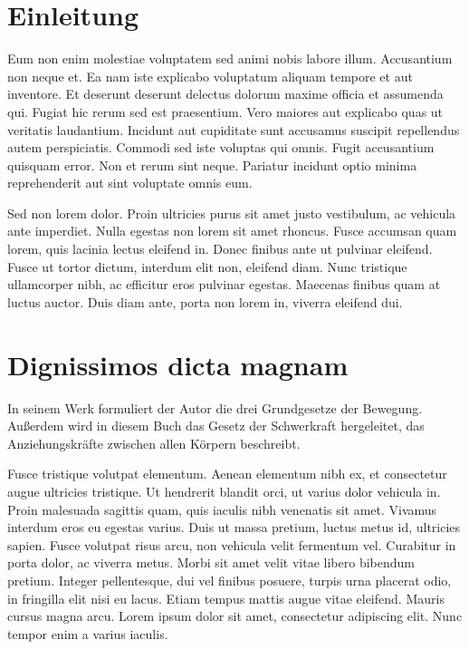 \documentclass[12pt, a4paper]{article}
\begin{document}
\pagestyle{empty}


\tableofcontents
\newpage
\pagestyle{plain}

\section{Einleitung}

Eum non enim molestiae voluptatem sed animi nobis labore illum. Accusantium non neque et. Ea nam iste explicabo voluptatum aliquam tempore et aut inventore. Et deserunt deserunt delectus dolorum maxime officia et assumenda qui. Fugiat hic rerum sed est praesentium. Vero maiores aut explicabo quas ut veritatis laudantium. Incidunt aut cupiditate sunt accusamus suscipit repellendus autem perspiciatis. Commodi sed iste voluptas qui omnis. Fugit accusantium quisquam error. Non et rerum sint neque. Pariatur incidunt optio minima reprehenderit aut sint voluptate omnis eum.

Sed non lorem dolor. Proin ultricies purus sit amet justo vestibulum, ac vehicula ante imperdiet. Nulla egestas non lorem sit amet rhoncus. Fusce accumsan quam lorem, quis lacinia lectus eleifend in. Donec finibus ante ut pulvinar eleifend. Fusce ut tortor dictum, interdum elit non, eleifend diam. Nunc tristique ullamcorper nibh, ac efficitur eros pulvinar egestas. Maecenas finibus quam at luctus auctor. Duis diam ante, porta non lorem in, viverra eleifend dui.

\section{Dignissimos dicta magnam\label{sec:kapitel_mit_abbildung}}

In seinem Werk  formuliert der Autor \citeauthor{newton1833} die drei Grundgesetze der Bewegung. Außerdem wird in diesem Buch das Gesetz der Schwerkraft hergeleitet, das Anziehungskräfte zwischen allen Körpern beschreibt.

Fusce tristique volutpat elementum. Aenean elementum nibh ex, et consectetur augue ultricies tristique. Ut hendrerit blandit orci, ut varius dolor vehicula in. Proin malesuada sagittis quam, quis iaculis nibh venenatis sit amet. Vivamus interdum eros eu egestas varius. Duis ut massa pretium, luctus metus id, ultricies sapien. Fusce volutpat risus arcu, non vehicula velit fermentum vel. Curabitur in porta dolor, ac viverra metus. Morbi sit amet velit vitae libero bibendum pretium. Integer pellentesque, dui vel finibus posuere, turpis urna placerat odio, in fringilla elit nisi eu lacus. Etiam tempus mattis augue vitae eleifend. Mauris cursus magna arcu. Lorem ipsum dolor sit amet, consectetur adipiscing elit. Nunc tempor enim a varius iaculis.
\end{document}
